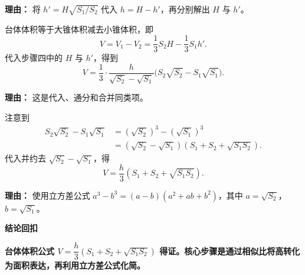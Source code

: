 \begin{proofbox}
\begin{description}[style=nextline, leftmargin=2.8em, labelsep=0.5em, itemsep=0.55em]
		      \par\textbf{理由：}
		      将 $h'=H\sqrt{S_1/S_2}$ 代入 $h=H-h'$，再分别解出 $H$ 与 $h'$。

		\item[\textbf{步骤五（体积差表达式）：}]
		      台体体积等于大锥体积减去小锥体积，即
		      \[
			      V=V_1-V_2=\frac13S_2H-\frac13S_1h'.
		      \]
		      代入步骤四中的 $H$ 与 $h'$，得到
		      \[
			      V=\frac13\cdot\frac{h}{\sqrt{S_2}-\sqrt{S_1}}\bigl(S_2\sqrt{S_2}-S_1\sqrt{S_1}\bigr).
		      \]

		      \par\textbf{理由：}
		      这是代入、通分和合并同类项。

		\item[\textbf{步骤六（因式分解与结论）：}]
		      注意到
		      \[
			      \begin{aligned}
				      S_2\sqrt{S_2}-S_1\sqrt{S_1}
				       & =(\sqrt{S_2})^3-(\sqrt{S_1})^3                   \\
				       & =(\sqrt{S_2}-\sqrt{S_1})(S_1+S_2+\sqrt{S_1S_2}).
			      \end{aligned}
		      \]
		      代入并约去 $\sqrt{S_2}-\sqrt{S_1}$，得
		      \[
			      V=\frac{h}{3}(S_1+S_2+\sqrt{S_1S_2}).
		      \]

		      \par\textbf{理由：}
		      使用立方差公式 $a^3-b^3=(a-b)(a^2+ab+b^2)$，其中 $a=\sqrt{S_2}$，$b=\sqrt{S_1}$。
	\end{description}

	\medskip

	\textbf{\textcolor{CProof}{结论回扣}}

	\textbf{台体体积公式 $V=\dfrac{h}{3}(S_1+S_2+\sqrt{S_1S_2})$ 得证。核心步骤是通过相似比将高转化为面积表达，再利用立方差公式化简。}

\end{proofbox}
